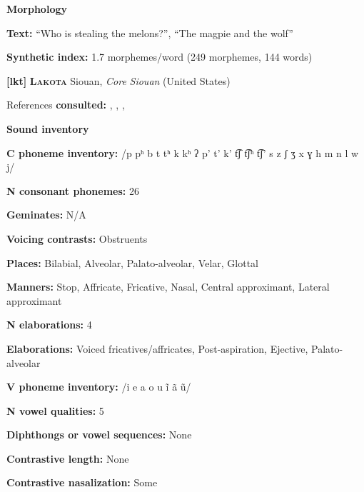 \textbf{Morphology}



\textbf{Text:} “Who is stealing the melons?”, “The magpie and the wolf” \citep[448-456]{Haspelmath1993}



\textbf{Synthetic index:} 1.7 morphemes/word (249 morphemes, 144 words)



\textbf{[lkt]}   \textbf{\textsc{Lakota}}    Siouan, \textit{Core} \textit{Siouan} (United States)



References \textbf{consulted:} \citet{Ingham2003}, \citet{LakotaLanguageConsortium2008}, \citet{Mirzayan2010}, \citet{RoodTaylor1996}



\textbf{Sound inventory}



\textbf{C phoneme inventory:} /p pʰ b t tʰ k kʰ ʔ p’ t’ k’ t͡ʃ t͡ʃʰ t͡ʃ’ s z ʃ ʒ x ɣ h m n l w j/



\textbf{N consonant phonemes:} 26



\textbf{Geminates:} N/A



\textbf{Voicing contrasts:} Obstruents



\textbf{Places:} Bilabial, Alveolar, Palato-alveolar, Velar, Glottal



\textbf{Manners:} Stop, Affricate, Fricative, Nasal, Central approximant, Lateral approximant



\textbf{N elaborations:} 4



\textbf{Elaborations:} Voiced fricatives/affricates, Post-aspiration, Ejective, Palato-alveolar



\textbf{V phoneme inventory:} /i e a o u ĩ ã ũ/



\textbf{N vowel qualities:} 5



\textbf{Diphthongs or vowel sequences:} None



\textbf{Contrastive length:} None



\textbf{Contrastive nasalization:} Some



